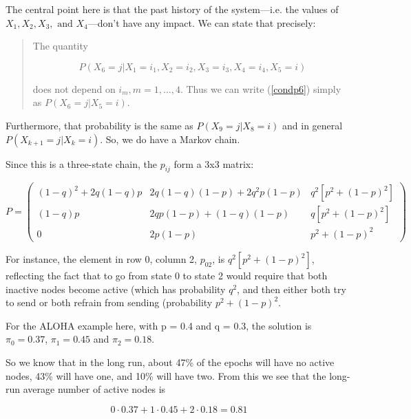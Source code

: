 The central point here is that the past history of the system---i.e. the
values of $X_1, X_2, X_3, \textrm{ and } X_4$---don't have any impact.
We can state that precisely:

\begin{quote}

The quantity

\begin{equation}
\label{condp6}
P(X_6 = j | X_1 = i_1, X_2 = i_2, X_3 = i_3, X_4 = i_4, X_5 = i)
\end{equation}

\noindent 
does not depend on $i_m, m = 1,...,4$.  Thus we can write (\ref{condp6})
simply as $P(X_6 = j | X_5 = i)$.  

\end{quote}

Furthermore, that probability is the same as $P(X_9 = j | X_8 = i)$ and
in general $P(X_{k+1} = j | X_k = i)$.  So, we do have a Markov chain.

Since this is a three-state chain, the $p_{ij}$ form a 3x3 matrix:

\begin{equation}
P = 
\left (
\begin{array}{ccc}
(1-q)^2 + 2q(1-q)p & 
   2q(1-q)(1-p) + 2q^2p(1-p) & 
   q^2 [p^2+(1-p)^2] \\
(1-q) p & 
   2qp(1-p) + (1-q)(1-p) & 
   q[p^2+(1-p)^2] \\
0 & 
   2p(1-p) & 
   p^2+(1-p)^2
\end{array}
\right )
\end{equation}

For instance, the element in row 0, column 2, $p_{02}$, is
$q^2[p^2+(1-p)^2]$, reflecting the fact that to go from state 0 to state
2 would require that both inactive nodes become active (which has
probability $q^2$, and then either both try to send or both refrain from
sending (probability $p^2+(1-p)^2$.

For the ALOHA example here, with p = 0.4 and q = 0.3, the solution is
$\pi_0 = 0.37$, $\pi_1 = 0.45$ and $\pi_2 = 0.18$.

So we know that in the long run, about 47\% of the epochs will have no
active nodes, 43\% will have one, and 10\% will have two.  From this we
see that the long-run average number of active nodes is

\begin{equation}
0 \cdot 0.37 + 1 \cdot 0.45 + 2 \cdot 0.18 = 0.81
\end{equation}

